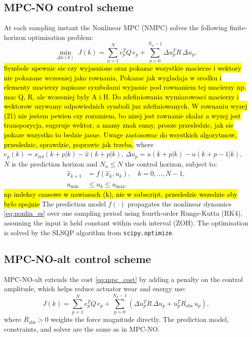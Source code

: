 \documentclass[twocolumn]{svjour3}
\begin{document}
\subsection{MPC-NO control scheme}

At each sampling instant the Nonlinear MPC (NMPC) solves the following finite-horizon
optimisation problem:
\begin{equation}
\min_{\Delta u(k)}\;J(k) = \sum_{p=1}^{N}e_p^T Q\,e_p
                              + \sum_{p=0}^{N_u-1}\Delta u_p^T R\,\Delta u_p,
\label{eq:mpc_cost}
\end{equation}
\hl{Symbole upewnic sie czy wyjasnione oraz pokazac wszystkie macierze i wektory nie pokazane wczesniej jako rownania, Pokazac jak wygladaja w srodku i elementy macierzy zapisane symbolami wyjasnic pod rownaniem tej macierzy np. mac Q, R, ale wczesniej byly A i B. Do zdefiniowania wymiarowosci macierzy i wektorow uzywamy odpowiednich symboli juz zdefiniowanych. W rownaniu wyzej (21) nie jestem pewien czy rozumiem, bo nizej jest rownanie skalar a wyzej jest transpozycja, sugeruje wektor, a mamy znak sumy, prosze przesledzic, jak sie pokaze wszystko to bedzie jasne. Uwage zastosowac do wsystkich algorytmow, przesledzic, sprawdzic, poprawic jak trzeba.}
where $e_p(k)=x_\mathrm{ref}(k{+}p|k)-\hat{x}(k{+}p|k)$,
$\Delta u_p = u(k{+}p|k)-u(k{+}p{-}1|k)$, $N$ is the prediction horizon and
$N_u\leq N$ the control horizon, subject to:
\begin{align}
\hat{x}_{k+1} &= f\!\left(\hat{x}_k,u_k\right),\quad k=0,\ldots,N{-}1,\\
u_{\min} &\leq u_k \leq u_{\max}.
\end{align}
\hl{np indeksy czasowe w nawiasach (k), nie w subscript, przesledzic wszedzie aby bylo spojnie}
The prediction model $f(\cdot)$ propagates the nonlinear dynamics \eqref{eq:nonlin_ss} over
one sampling period using fourth-order Runge-Kutta (RK4), assuming the input is held constant
within each interval (ZOH). The optimisation is solved by the SLSQP algorithm from
\texttt{scipy.optimize}.

\subsection{MPC-NO-alt control scheme}

MPC-NO-alt extends the cost \eqref{eq:mpc_cost} by adding a penalty on the control amplitude,
which helps reduce actuator wear and energy use:
\begin{equation}
J(k) = \sum_{p=1}^{N}e_p^T Q\,e_p
      + \sum_{p=0}^{N_u-1}\!\left(\Delta u_p^T R\,\Delta u_p + u_p^T R_\mathrm{abs}\,u_p\right),
\end{equation}
where $R_\mathrm{abs}>0$ weights the force magnitude directly. The prediction model,
constraints, and solver are the same as in MPC-NO.
\end{document}
